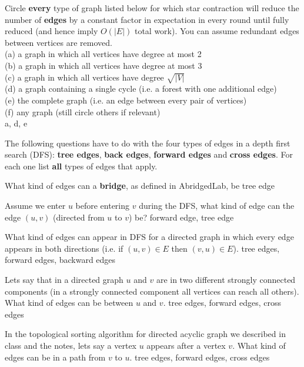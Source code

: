 %
%
\begin{problem}
\ask
Circle \textbf{every} type of graph listed below for which star
contraction will reduce the number of \textbf{edges} by a constant
factor in expectation in every round until fully reduced (and hence
imply $O(|E|)$ total work).  You can assume redundant edges between
vertices are removed.\\

(a) a graph in which all vertices have degree at most 2\\
(b) a graph in which all vertices have degree at most 3\\
(c) a graph in which all vertices have degree $\sqrt{|V|}$\\
(d) a graph containing a single cycle (i.e. a forest with one additional edge)\\
(e) the complete graph (i.e. an edge between every pair of vertices)\\
(f) any graph (still circle others if relevant)\\

\sol
a, d, e
\end{problem}


\begin{problem}
%

The following questions have to do with the four types of edges in
a depth first search (DFS): \textbf{tree edges}, \textbf{back edges},
\textbf{forward edges} and \textbf{cross edges}.  For each one list
\textbf{all} types of edges that apply.


\ask[3]
What kind of edges can a \textbf{bridge}, as defined in AbridgedLab, be
\sol
tree edge

\ask[3]
Assume we enter $u$ before entering $v$ during the DFS, what kind of
edge can the edge $(u,v)$ (directed from $u$ to $v$) be?
\sol
forward edge, tree edge


\ask[3]
What kind of edges can appear in DFS for a directed graph in which
every edge appears in both directions (i.e. if $(u,v) \in E$ then $(v,u)
\in E$).
\sol
tree edges, forward edges, backward edges


\ask[3] Lets say that in a directed graph $u$ and $v$ are in two
different strongly connected components (in a strongly connected
component all vertices can reach all others).  What kind of edges can
be between $u$ and $v$.
\sol
tree edges, forward edges, cross edges

\ask[3]
In the topological sorting algorithm for directed acyclic graph we
described in class and the notes, lets say a vertex $u$ appears
after a vertex $v$.  What kind of edges can be in a path
from $v$ to $u$.
\sol
tree edges, forward edges, cross edges

\end{problem}




